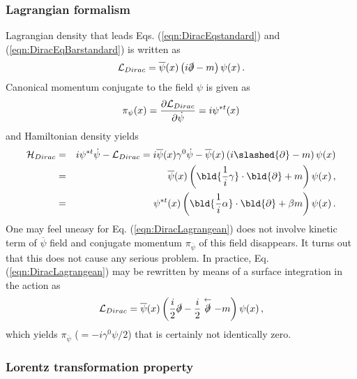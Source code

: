 \subsubsection{Lagrangian formalism}

Lagrangian density that leads Eqs. (\ref{eqn:DiracEqstandard}) and (\ref{eqn:DiracEqBarstandard})
is written as
\begin{eqnarray}
{\cal L}_{Dirac}
=
\overline{\psi}(x)
\left(i \slashed{\partial} - m \right)
\psi(x) \,.
\label{eqn:DiracLagrangean}
\end{eqnarray}
Canonical momentum conjugate to the field $\psi$ is given as
\begin{eqnarray}
\pi_{\psi}(x) = \frac{\partial {\cal L}_{Dirac}}{\partial \dot{\psi}}
=
i \psi^{*t} (x) 
\end{eqnarray}
and Hamiltonian density yields
\begin{eqnarray}
{\cal H}_{Dirac}
&=&
i \psi^{*t}  \dot {\psi} - {\cal L}_{Dirac}
= 
i \overline{\psi}(x) \gamma^0 \dot {\psi}
- 
\overline{\psi}(x)
\left(i \slashed{\partial} - m \right)
\psi(x)
\nonumber\\
&=&
\overline{\psi}(x)
\left(
 \bld{ \frac{1}{i}\gamma}\cdot\bld{\partial} + m 
 \right)
 \psi(x)\,,
 \\
 &=&
\psi^{*t}(x)
\left(
 \bld{ \frac{1}{i}\alpha}\cdot\bld{\partial} + \beta m 
 \right)
 \psi(x)\,.
\end{eqnarray}
One may feel uneasy for Eq. (\ref{eqn:DiracLagrangean})
does not involve kinetic term of $\overline{\psi}$ field and
conjugate momentum $\pi_{\overline{\psi}}$ of this field disappears. It turns out
that this does not cause any serious problem. In practice,
Eq. (\ref{eqn:DiracLagrangean}) may be rewritten by means
of a surface integration in the action as \cite{ref:Itzykson-Zuber}
\begin{eqnarray}
{\cal L}_{Dirac}
=
\overline{\psi}(x)
\left(
\frac{i}{2} \slashed{\partial}
- \frac{i}{2}  \stackrel{\leftarrow}{\slashed{\partial}}
 - m \right)
\psi(x) \,,
\label{eqn:DiracLagrangeanIZ}
\end{eqnarray}
which yields $\pi_{\overline{\psi}}$ ($= -i \gamma^0 \psi / 2$)
that is certainly not identically zero.

\bigskip
\subsubsection{Lorentz transformation property}

